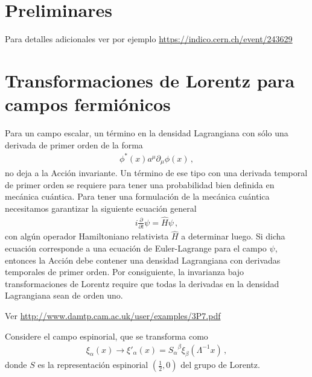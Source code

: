 \section{Preliminares}

Para detalles adicionales ver por ejemplo \url{https://indico.cern.ch/event/243629}


\section{Transformaciones de Lorentz para campos fermiónicos}
\label{sec:transf-de-lorentz-1}

Para un campo escalar, un término en la densidad Lagrangiana con sólo una derivada de primer orden de la forma
\begin{align}
\label{eq:nolor}
  \phi^*(x)a^\mu\partial_\mu\phi(x)\,,
\end{align}
no deja a la Acción invariante. Un término de ese tipo con una derivada temporal de primer orden se requiere para tener una probabilidad bien definida en mecánica cuántica.
Para tener una formulación de la mecánica cuántica necesitamos garantizar la siguiente ecuación general
\begin{align}
  \label{eq:generalschro}
  i\frac{\partial}{\partial t}\psi=\hat{H} \psi\,,  
\end{align}
con algún operador Hamiltoniano relativista  $\widehat{H}$ a determinar luego. Si dicha ecuación corresponde a una ecuación de Euler-Lagrange para el campo $\psi$,
entonces la Acción debe contener una densidad Lagrangiana con derivadas temporales de primer orden. Por consiguiente, la invarianza bajo transformaciones de Lorentz require que todas la derivadas en la densidad Lagrangiana sean de orden uno.

Ver \url{http://www.damtp.cam.ac.uk/user/examples/3P7.pdf}

\begin{frame}
Considere el campo espinorial, que se transforma como
\begin{align}
\label{eq:184qft}
  \xi_\alpha(x)\to\xi'_\alpha(x)={S_\alpha}^\beta\xi_\beta(\Lambda^{-1}x)\,, 
\end{align}
donde $S$ es la representación espinorial $(\frac{1}{2},0)$ del grupo de Lorentz. 
\end{frame}

